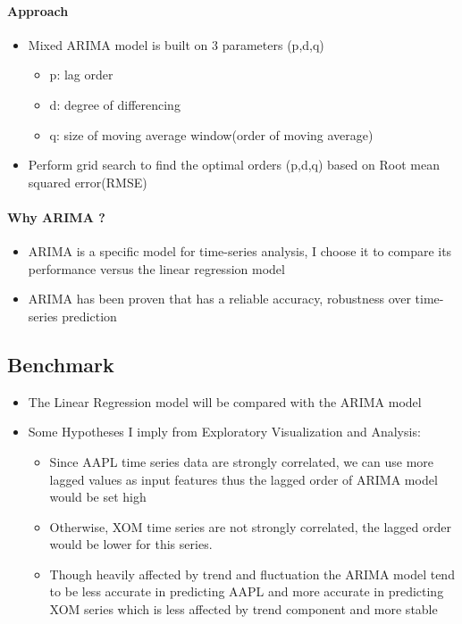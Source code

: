 \documentclass[11pt]{article}
\providecommand{\tightlist}{%
      \setlength{\itemsep}{0pt}\setlength{\parskip}{0pt}}
\begin{document}
\paragraph{Approach}\label{approach}

\begin{itemize}
\tightlist
\item
  Mixed ARIMA model is built on 3 parameters (p,d,q)

  \begin{itemize}
  \tightlist
  \item
    p: lag order
  \item
    d: degree of differencing
  \item
    q: size of moving average window(order of moving average)
  \end{itemize}
\item
  Perform grid search to find the optimal orders (p,d,q) based on Root
  mean squared error(RMSE)
\end{itemize}

\paragraph{Why ARIMA ?}\label{why-arima}

\begin{itemize}
\tightlist
\item
  ARIMA is a specific model for time-series analysis, I choose it to
  compare its performance versus the linear regression model
\item
  ARIMA has been proven that has a reliable accuracy, robustness over
  time-series prediction
\end{itemize}

\subsection{Benchmark}\label{benchmark}

\begin{itemize}
\tightlist
\item
  The Linear Regression model will be compared with the ARIMA model
\item
  Some Hypotheses I imply from Exploratory Visualization and Analysis:

  \begin{itemize}
  \tightlist
  \item
    Since AAPL time series data are strongly correlated, we can use more
    lagged values as input features thus the lagged order of ARIMA model
    would be set high
  \item
    Otherwise, XOM time series are not strongly correlated, the lagged
    order would be lower for this series.
  \item
    Though heavily affected by trend and fluctuation the ARIMA model
    tend to be less accurate in predicting AAPL and more accurate in
    predicting XOM series which is less affected by trend component and
    more stable
  \end{itemize}
\end{itemize}
\end{document}
